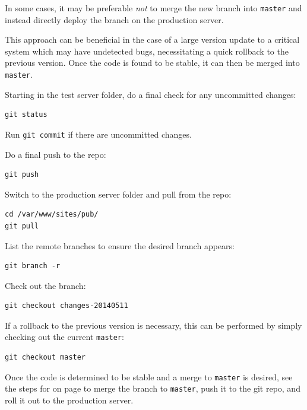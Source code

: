 \documentclass[pdflatex,letterpaper,twoside,12pt]{book}
\begin{document}
In some cases, it may be preferable \emph{not} to merge the new branch into \texttt{master} and instead directly deploy the branch on the production server.

This approach can be beneficial in the case of a large version update to a critical system which may have undetected bugs, necessitating a quick rollback to the previous version.  Once the code is found to be stable, it can then be merged into \texttt{master}.

Starting in the test server folder, do a final check for any uncommitted changes:

\begin{verbatim}
git status
\end{verbatim}

Run \texttt{git commit} if there are uncommitted changes.

Do a final push to the repo:

\begin{verbatim}
git push
\end{verbatim}

Switch to the production server folder and pull from the repo:

\begin{verbatim}
cd /var/www/sites/pub/
git pull
\end{verbatim}

List the remote branches to ensure the desired branch appears:

\begin{verbatim}
git branch -r
\end{verbatim}

Check out the branch:

\begin{verbatim}
git checkout changes-20140511
\end{verbatim}

If a rollback to the previous version is necessary, this can be performed by simply checking out the current \texttt{master}:

\begin{verbatim}
git checkout master
\end{verbatim}

Once the code is determined to be stable and a merge to \texttt{master} is desired, see the steps for  on page \pageref{publish-plan-a} to merge the branch to \texttt{master}, push it to the git repo, and roll it out to the production server.
\end{document}
